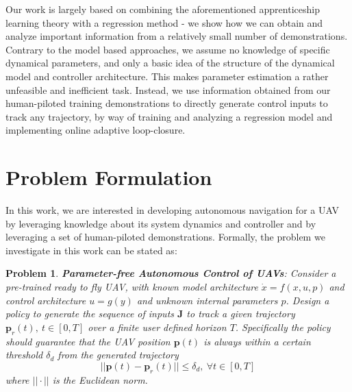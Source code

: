 \documentclass[letterpaper, 10 pt, conference]{ieeeconf}  %
\newcommand\NB[1]{$\spadesuit$\footnote{NB: #1}}
\newtheorem{problem}{Problem}
\begin{document}
Our work is largely based on combining the aforementioned apprenticeship learning theory with a regression method - we show how we can obtain and analyze important information from a relatively small number of demonstrations. Contrary to the model based approaches, we assume no knowledge of specific dynamical parameters, and only a basic idea of the structure of the dynamical model and controller architecture. This makes parameter estimation a rather unfeasible and inefficient task. Instead, we use information obtained from our human-piloted training demonstrations to directly generate control inputs to track any trajectory, by way of training and analyzing a regression model and implementing online adaptive loop-closure.



\section{Problem Formulation}
In this work, we are interested in developing autonomous navigation for a UAV by leveraging knowledge about its system dynamics and controller and by leveraging a set of human-piloted demonstrations.
Formally, the problem we investigate in this work can be stated as:

\begin{problem}

 \textbf{\textit{Parameter-free Autonomous Control of UAVs}}: 
Consider a pre-trained ready to fly UAV, with known model architecture $\dot{x}=f(x,u,p)$ and control architecture $u=g(y)$ and unknown internal parameters $p$. Design a policy to generate the sequence of inputs $\mathbf{J}$ to track a given trajectory $\mathbf{p}_r(t),~ t \in [0,T]$ over a finite user defined horizon $T$. Specifically the policy should guarantee that the UAV position $\mathbf{p}(t)$ is always within a certain threshold $\delta_d$ from the generated trajectory 
 \begin{equation} \label{eq:positlive}
        ||\mathbf{p}(t)-\mathbf{p}_r(t)|| \leq \delta_d,~\forall t \in [0,T]
    \end{equation}
    where $||\cdot||$ is the Euclidean norm.

\end{problem}
\end{document}
